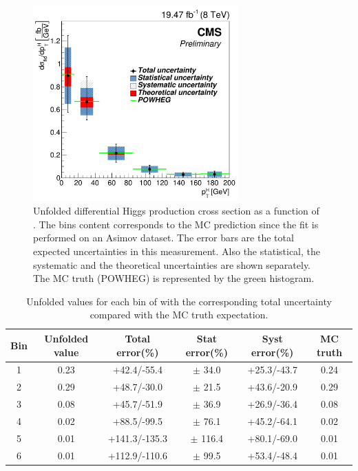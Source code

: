 \begin{figure}[htb]
\centering
\includegraphics[width=0.7\textwidth]{images/plotsPreApp/unfolded_kreg3.pdf}
\caption{Unfolded differential Higgs production cross section as a function of \pth. The bins content corresponds to the MC prediction since the fit is performed on an Asimov dataset. The error bars are the total expected uncertainties in this measurement. Also the statistical, the systematic and the theoretical uncertainties are shown separately. The MC truth (POWHEG) is represented by the green histogram.\label{fig:final_plot}}
\end{figure}

\begin{table}[htb]
\caption{Unfolded values for each bin of \pth with the corresponding total uncertainty compared with the MC truth expectation.}\label{table:results}
\centering
\begin{tabular}{c|ccccc}
Bin & Unfolded value & Total error(\%) & Stat error(\%) & Syst error(\%) & MC truth \\ 
\hline 
\hline 
1 & 0.23 & +42.4/-55.4 & $\pm$ 34.0 & +25.3/-43.7  &  0.24 \\ 
2 & 0.29 & +48.7/-30.0 & $\pm$ 21.5 & +43.6/-20.9  &  0.29 \\ 
3 & 0.08 & +45.7/-51.9 & $\pm$ 36.9 & +26.9/-36.4  &  0.08 \\ 
4 & 0.02 & +88.5/-99.5 & $\pm$ 76.1 & +45.2/-64.1  &  0.02 \\ 
5 & 0.01 & +141.3/-135.3 & $\pm$ 116.4 & +80.1/-69.0  &  0.01 \\ 
6 & 0.01 & +112.9/-110.6 & $\pm$ 99.5 & +53.4/-48.4  &  0.01 \\ 
\hline 
\end{tabular}
\end{table}

